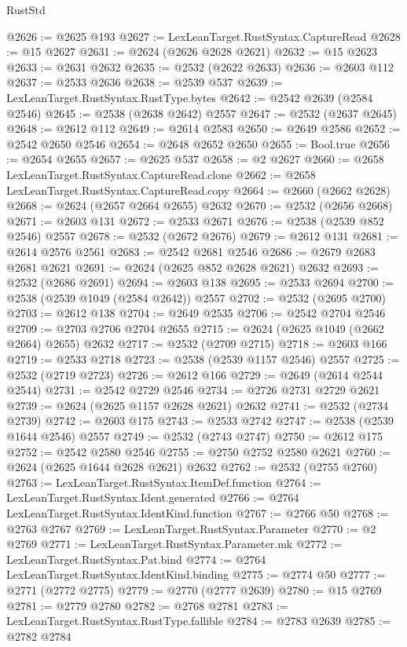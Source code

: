 \begin{lexlean}{RustStd}
\begin{coremodule}
@2626 := @2625 @193
@2627 := LexLeanTarget.RustSyntax.CaptureRead
@2628 := @15 @2627
@2631 := @2624 (@2626 @2628 @2621)
@2632 := @15 @2623
@2633 := @2631 @2632
@2635 := @2532 (@2622 @2633)
@2636 := @2603 @112
@2637 := @2533 @2636
@2638 := @2539 @537
@2639 := LexLeanTarget.RustSyntax.RustType.bytes
@2642 := @2542 @2639 (@2584 @2546)
@2645 := @2538 (@2638 @2642) @2557
@2647 := @2532 (@2637 @2645)
@2648 := @2612 @112
@2649 := @2614 @2583
@2650 := @2649 @2586
@2652 := @2542 @2650 @2546
@2654 := @2648 @2652 @2650
@2655 := Bool.true
@2656 := @2654 @2655
@2657 := @2625 @537
@2658 := @2 @2627
@2660 := @2658 LexLeanTarget.RustSyntax.CaptureRead.clone
@2662 := @2658 LexLeanTarget.RustSyntax.CaptureRead.copy
@2664 := @2660 (@2662 @2628)
@2668 := @2624 (@2657 @2664 @2655) @2632
@2670 := @2532 (@2656 @2668)
@2671 := @2603 @131
@2672 := @2533 @2671
@2676 := @2538 (@2539 @852 @2546) @2557
@2678 := @2532 (@2672 @2676)
@2679 := @2612 @131
@2681 := @2614 @2576 @2561
@2683 := @2542 @2681 @2546
@2686 := @2679 @2683 @2681 @2621
@2691 := @2624 (@2625 @852 @2628 @2621) @2632
@2693 := @2532 (@2686 @2691)
@2694 := @2603 @138
@2695 := @2533 @2694
@2700 := @2538 (@2539 @1049 (@2584 @2642)) @2557
@2702 := @2532 (@2695 @2700)
@2703 := @2612 @138
@2704 := @2649 @2535
@2706 := @2542 @2704 @2546
@2709 := @2703 @2706 @2704 @2655
@2715 := @2624 (@2625 @1049 (@2662 @2664) @2655) @2632
@2717 := @2532 (@2709 @2715)
@2718 := @2603 @166
@2719 := @2533 @2718
@2723 := @2538 (@2539 @1157 @2546) @2557
@2725 := @2532 (@2719 @2723)
@2726 := @2612 @166
@2729 := @2649 (@2614 @2544 @2544)
@2731 := @2542 @2729 @2546
@2734 := @2726 @2731 @2729 @2621
@2739 := @2624 (@2625 @1157 @2628 @2621) @2632
@2741 := @2532 (@2734 @2739)
@2742 := @2603 @175
@2743 := @2533 @2742
@2747 := @2538 (@2539 @1644 @2546) @2557
@2749 := @2532 (@2743 @2747)
@2750 := @2612 @175
@2752 := @2542 @2580 @2546
@2755 := @2750 @2752 @2580 @2621
@2760 := @2624 (@2625 @1644 @2628 @2621) @2632
@2762 := @2532 (@2755 @2760)
@2763 := LexLeanTarget.RustSyntax.ItemDef.function
@2764 := LexLeanTarget.RustSyntax.Ident.generated
@2766 := @2764 LexLeanTarget.RustSyntax.IdentKind.function
@2767 := @2766 @50
@2768 := @2763 @2767
@2769 := LexLeanTarget.RustSyntax.Parameter
@2770 := @2 @2769
@2771 := LexLeanTarget.RustSyntax.Parameter.mk
@2772 := LexLeanTarget.RustSyntax.Pat.bind
@2774 := @2764 LexLeanTarget.RustSyntax.IdentKind.binding
@2775 := @2774 @50
@2777 := @2771 (@2772 @2775)
@2779 := @2770 (@2777 @2639)
@2780 := @15 @2769
@2781 := @2779 @2780
@2782 := @2768 @2781
@2783 := LexLeanTarget.RustSyntax.RustType.fallible
@2784 := @2783 @2639
@2785 := @2782 @2784

\end{coremodule}
\end{lexlean}

